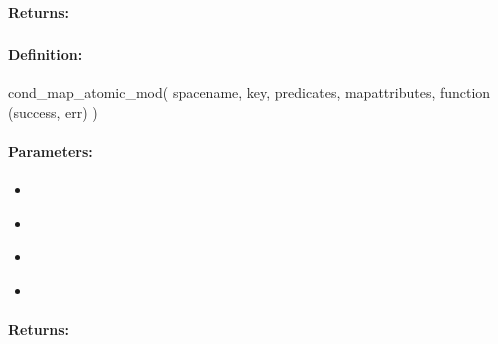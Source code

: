 \paragraph{Returns:}


\pagebreak
\subsubsection{}
\label{api:nodejs:cond_map_atomic_mod}


\paragraph{Definition:}
\begin{javascriptcode}
cond_map_atomic_mod(
        spacename, key, predicates, mapattributes, function (success, err) {})
\end{javascriptcode}
\paragraph{Parameters:}
\begin{itemize}[noitemsep]
\item {}\\

\item {}\\

\item {}\\

\item {}\\

\end{itemize}

\paragraph{Returns:}


\pagebreak
\subsubsection{}
\label{api:nodejs:group_map_atomic_mod}


